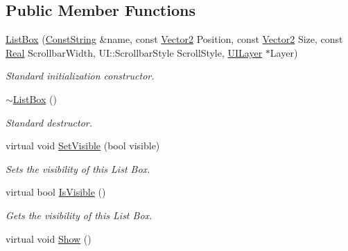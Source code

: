 \subsection*{Public Member Functions}
\begin{DoxyCompactItemize}
\item 
\hyperlink{classphys_1_1UI_1_1ListBox_a0bf957f875c9a7c5361c26b5001ce821}{ListBox} (\hyperlink{namespacephys_a5ce5049f8b4bf88d6413c47b504ebb31}{ConstString} \&name, const \hyperlink{classphys_1_1Vector2}{Vector2} Position, const \hyperlink{classphys_1_1Vector2}{Vector2} Size, const \hyperlink{namespacephys_af7eb897198d265b8e868f45240230d5f}{Real} ScrollbarWidth, UI::ScrollbarStyle ScrollStyle, \hyperlink{classphys_1_1UILayer}{UILayer} $\ast$Layer)
\begin{DoxyCompactList}\small\item\em Standard initialization constructor. \item\end{DoxyCompactList}\item 
\hypertarget{classphys_1_1UI_1_1ListBox_a582423223a2e310afc2a32c84d937502}{
\hyperlink{classphys_1_1UI_1_1ListBox_a582423223a2e310afc2a32c84d937502}{$\sim$ListBox} ()}
\label{d0/d28/classphys_1_1UI_1_1ListBox_a582423223a2e310afc2a32c84d937502}

\begin{DoxyCompactList}\small\item\em Standard destructor. \item\end{DoxyCompactList}\item 
virtual void \hyperlink{classphys_1_1UI_1_1ListBox_abb3c87bf6669100296c1fa4f4913ea33}{SetVisible} (bool visible)
\begin{DoxyCompactList}\small\item\em Sets the visibility of this List Box. \item\end{DoxyCompactList}\item 
virtual bool \hyperlink{classphys_1_1UI_1_1ListBox_a638f19eb6e5a0bd3291fab1ebaccc84f}{IsVisible} ()
\begin{DoxyCompactList}\small\item\em Gets the visibility of this List Box. \item\end{DoxyCompactList}\item 
\hypertarget{classphys_1_1UI_1_1ListBox_add82890a307bc8fc984a0a029cfb88ae}{
virtual void \hyperlink{classphys_1_1UI_1_1ListBox_add82890a307bc8fc984a0a029cfb88ae}{Show} ()}
\label{d0/d28/classphys_1_1UI_1_1ListBox_add82890a307bc8fc984a0a029cfb88ae}


\end{DoxyCompactItemize}
